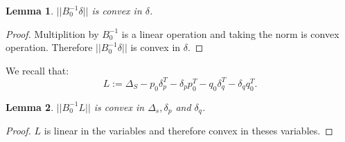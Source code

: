 \documentclass[11pt,twocolumn,varwidth=true,a4paper,fleqn]{article}
\newtheorem{lemma}{Lemma}
\begin{document}
\begin{lemma} \label{delta}
$||B_0^{-1}\delta||$ is convex in $\delta$.
\end{lemma}
\begin{proof}
Multiplition by $B_0^{-1}$ is a linear operation and taking the norm is convex
operation. Therefore $||B_0^{-1}\delta||$ is convex in $\delta$.
\end{proof}

We recall that:
\begin{equation*} 
L:= \Delta_S - p_0\delta_p^T - \delta_pp_0^T - q_0\delta_q^T - \delta_qq_0^T.
\end{equation*}
\begin{lemma} \label{L}
$||B_0^{-1}L||$ is convex in $\Delta_s, \delta_p$
and $\delta_q$.
\end{lemma}
\begin{proof}
$L$ is linear in the variables and therefore convex in theses variables.
\end{proof}
\end{document}
